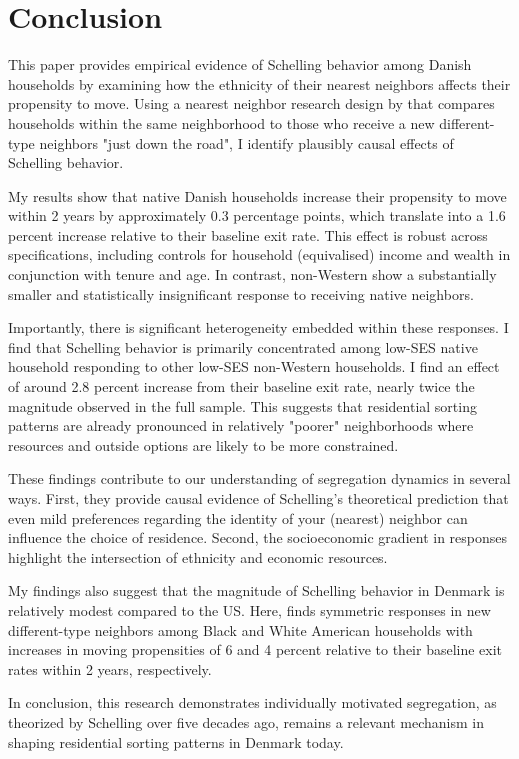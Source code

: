 \documentclass[../main.tex]{subfiles}
\begin{document}
\section{Conclusion}
\label{sec:conclusion}
This paper provides empirical evidence of Schelling behavior among Danish households by examining how the ethnicity of their nearest neighbors affects their propensity to move. Using a nearest neighbor research design by \textcite{Bayer_2022_nearest_neighbor} that compares households within the same neighborhood to those who receive a new different-type neighbors "just down the road", I identify plausibly causal effects of Schelling behavior.

My results show that native Danish households increase their propensity to move within 2 years by approximately 0.3 percentage points, which translate into a 1.6 percent increase relative to their baseline exit rate. This effect is robust across specifications, including controls for household (equivalised) income and wealth in conjunction with tenure and age. In contrast, non-Western show a substantially smaller and statistically insignificant response to receiving native neighbors. 

Importantly, there is significant heterogeneity embedded within these responses. I find that Schelling behavior is primarily concentrated among low-SES native household responding to other low-SES non-Western households. I find an effect of around 2.8 percent increase from their baseline exit rate, nearly twice the magnitude observed in the full sample. This suggests that residential sorting patterns are already pronounced in relatively "poorer" neighborhoods where resources and outside options are likely to be more constrained.

These findings contribute to our understanding of segregation dynamics in several ways. First, they provide causal evidence of Schelling's theoretical prediction that even mild preferences regarding the identity of your (nearest) neighbor can influence the choice of residence. Second, the socioeconomic gradient in responses highlight the intersection of ethnicity and economic resources.

My findings also suggest that the magnitude of Schelling behavior in Denmark is relatively modest compared to the US. Here, \textcite{Bayer_2022_nearest_neighbor} finds symmetric responses in new different-type neighbors among Black and White American households with increases in moving propensities of 6 and 4 percent relative to their baseline exit rates within 2 years, respectively. 

In conclusion, this research demonstrates individually motivated segregation, as theorized by Schelling over five decades ago, remains a relevant mechanism in shaping residential sorting patterns in Denmark today. 
\end{document}
